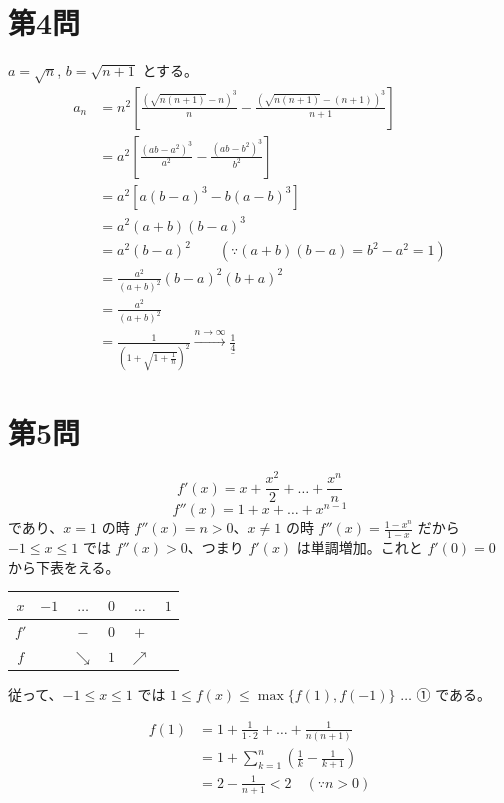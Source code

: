 \documentclass[../main.tex]{subfiles}
\begin{document}
\newpage

\section*{第4問}

\noindent
[\textbf{解}] $a = \sqrt{n}$, $b = \sqrt{n+1}$ とする。
\begin{align*}
  a_n &= n^2 \left[ \frac{(\sqrt{n(n+1)} - n)^3}{n} - \frac{(\sqrt{n(n+1)} - (n+1))^3}{n+1} \right] \\
  &= a^2 \left[ \frac{(ab - a^2)^3}{a^2} - \frac{(ab - b^2)^3}{b^2} \right] \\
  &= a^2 \left[ a(b - a)^3 - b(a - b)^3 \right] \\
  &= a^2 (a + b)(b - a)^3 \\
  &= a^2 (b - a)^2 \qquad (\because (a + b)(b - a) = b^2 - a^2 = 1) \\
  &= \frac{a^2}{(a + b)^2} (b - a)^2 (b + a)^2 \\
  &= \frac{a^2}{(a + b)^2} \\
  &= \frac{1}{\left(1 + \sqrt{1 + \frac{1}{n}}\right)^2} \xrightarrow{n \to \infty} \underline{\frac{1}{4}}
\end{align*}

\newpage

\section*{第5問}

\noindent
[\textbf{解}]
\[
  f'(x) = x + \frac{x^2}{2} + \dots + \frac{x^n}{n}
\]
\[
  f''(x) = 1 + x + \dots + x^{n-1}
\]
であり、$x = 1$ の時 $f''(x) = n > 0$、$x \neq 1$ の時 $f''(x) = \frac{1 - x^n}{1 - x}$ だから $-1 \le x \le 1$ では $f''(x) > 0$、つまり $f'(x)$ は単調増加。これと $f'(0) = 0$ から下表をえる。

\begin{center}
  \begin{tabular}{c|ccccc}
    $x$ & $-1$ & $\dots$ & $0$ & $\dots$ & $1$ \\ \hline
    $f'$ & & $-$ & $0$ & $+$ & \\ \hline
    $f$ & & $\searrow$ & $1$ & $\nearrow$ &
  \end{tabular}
\end{center}

従って、$-1 \le x \le 1$ では $1 \le f(x) \le \max\{ f(1), f(-1) \}$ $\dots$ ① である。

\begin{align*}
  f(1) &= 1 + \frac{1}{1 \cdot 2} + \dots + \frac{1}{n(n+1)} \\
  &= 1 + \sum_{k=1}^n \left( \frac{1}{k} - \frac{1}{k+1} \right) \\
  &= 2 - \frac{1}{n+1} < 2 \quad (\because n > 0)
\end{align*}
\end{document}
